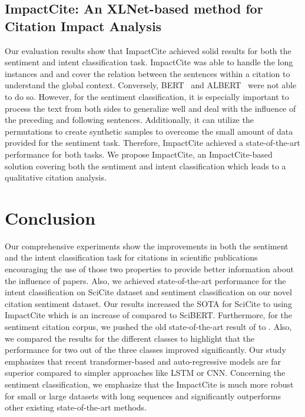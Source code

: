 \documentclass[runningheads]{llncs}
\begin{document}
\subsection{ImpactCite: An XLNet-based method for Citation Impact Analysis}
Our evaluation results show that ImpactCite achieved solid results for both the sentiment and intent classification task. ImpactCite was able to handle the long instances and and cover the relation between the sentences within a citation to understand the global context. Conversely, BERT~\cite{devlin2018bert} and ALBERT~\cite{lan2019albert} were not able to do so. However, for the sentiment classification, it is especially important to process the text from both sides to generalize well and deal with the influence of the preceding and following sentences. Additionally, it can utilize the permutations to create synthetic samples to overcome the small amount of data provided for the sentiment task. Therefore, ImpactCite achieved a state-of-the-art performance for both tasks. We propose ImpactCite, an ImpactCite-based solution covering both the sentiment and intent classification which leads to a qualitative citation analysis.


\section{Conclusion}
Our comprehensive experiments show the improvements in both the sentiment and the intent classification task for citations in scientific publications encouraging the use of those two properties to provide better information about the influence of papers. Also, we achieved state-of-the-art performance for the intent classification on SciCite \cite{cohan2019structural} dataset and sentiment classification on our novel citation sentiment dataset. Our results increased the SOTA for SciCite to  using ImpactCite which is an increase of  compared to SciBERT. Furthermore, for the sentiment citation corpus, we pushed the old state-of-the-art result of  to . Also, we compared the results for the different classes to highlight that the performance for two out of the three classes improved significantly. Our study emphasizes that recent transformer-based and auto-regressive models are far superior compared to simpler approaches like LSTM or CNN. Concerning the sentiment classification, we emphasize that the ImpactCite is much more robust for small or large datasets with long sequences and significantly outperforms other existing state-of-the-art methods. 

 
\end{document}
